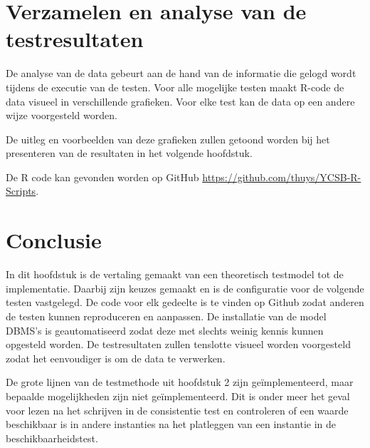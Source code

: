 \section{Verzamelen en analyse van de testresultaten}
De analyse van de data gebeurt aan de hand van de informatie die gelogd wordt tijdens de executie van de testen. Voor alle mogelijke testen maakt R-code de data visueel in verschillende grafieken. Voor elke test kan de data op een andere wijze voorgesteld worden. 

De uitleg en voorbeelden van deze grafieken zullen getoond worden bij het presenteren van de resultaten in het volgende hoofdstuk. 

De R code kan gevonden worden op GitHub \url{https://github.com/thuys/YCSB-R-Scripts}.  

\section{Conclusie}
In dit hoofdstuk is de vertaling gemaakt van een theoretisch testmodel tot de implementatie. Daarbij zijn keuzes gemaakt en is de configuratie voor de volgende testen vastgelegd. De code voor elk gedeelte is te vinden op Github zodat anderen de testen kunnen reproduceren en aanpassen. De installatie van de model DBMS's is geautomatiseerd zodat deze met slechts weinig kennis kunnen opgesteld worden. De testresultaten zullen tenslotte visueel worden voorgesteld zodat het eenvoudiger is om de data te verwerken. 

De grote lijnen van de testmethode uit hoofdstuk 2 zijn geïmplementeerd, maar bepaalde mogelijkheden zijn niet geïmplementeerd. Dit is onder meer het geval voor lezen na het schrijven in de consistentie test en controleren of een waarde beschikbaar is in andere instanties na het platleggen van een instantie in de beschikbaarheidstest. 
